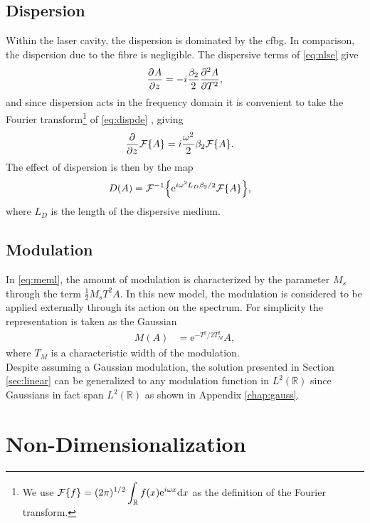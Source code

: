 \subsection{Dispersion}
Within the laser cavity, the dispersion is dominated by the \gls{cfbg}. In comparison, the dispersion due to the fibre is negligible. The dispersive terms of \eqref{eq:nlse} give
\begin{align}
\label{eq:dispde}
	\pdiff{A}{z} = -i \frac{\beta_2}{2} \pdiff[2]{A}{T},
\end{align}
and since dispersion acts in the frequency domain it is convenient to take the Fourier transform\footnote{We use $\displaystyle \FT{f} = (2 \pi)^{1/2} \int_\mathbb{R} f(x) \textrm{e}^{i \omega x} \df x$ as the definition of the Fourier transform.} of \eqref{eq:dispde} \cite{debnath, gradshteyn}, giving
\begin{align*}
	\pdiff{}{z}\FT{A} &= i\frac{\omega^2}{2}\beta_2 \FT{A}.
\end{align*}
The effect of dispersion is then by the map
\begin{align*}
D(A) &= \FTi{\textrm{e}^{i \omega^2 L_D\beta_2/2} \FT{A}},
\end{align*}
where $L_D$ is the length of the dispersive medium. \\

\subsection{Modulation}
In \eqref{eq:meml}, the amount of modulation is characterized by the parameter $M_s$ through the term $\frac{1}{2} M_s T^2 A$. In this new model, the modulation is considered to be applied externally through its action on the spectrum. For simplicity the representation is taken as the Gaussian
\begin{align*}
M(A) &= \textrm{e}^{-T^2 / 2 T_M^2} A,
\end{align*}
where $T_M$ is a characteristic width of the modulation. \\

Despite assuming a Gaussian modulation, the solution presented in Section \ref{sec:linear} can be generalized to any modulation function in $L^2(\mathbb{R})$ since Gaussians in fact span $L^2(\mathbb{R})$ as shown in Appendix \ref{chap:gauss}. \\

%

\section{Non-Dimensionalization}

